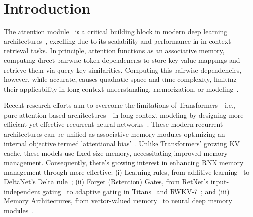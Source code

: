 \section{Introduction}\label{sec:intro}
The attention module~\citep{bahdanau2014neural} is a critical building block in modern deep learning architectures~\citep{transformers, achiam2023gpt, behrouz2024titans, team2025gemma}, excelling due to its scalability and performance in in-context retrieval tasks. In principle, attention functions as an associative memory, computing direct pairwise token dependencies to store key-value mappings and retrieve them via query-key similarities. Computing this  pairwise dependencies, however, while accurate, causes quadratic space and time complexity, limiting their applicability in long context understanding, memorization, or modeling~\citep{liu2024lost, li2024survey, dalal2025one}.







Recent research efforts aim to overcome the limitations of Transformers—i.e., pure attention-based architectures—in long-context modeling by designing more efficient yet effective recurrent neural networks~\citep{schlag2021linear, behrouz2024titans, peng2025rwkv7}. These modern recurrent architectures can be unified as associative memory modules optimizing an internal objective termed 'attentional bias'~\citep{behrouz2025Miras}. Unlike Transformers' growing KV cache, these models use fixed-size memory, necessitating improved memory management. Consequently, there's growing interest in enhancing RNN memory management through more effective: (i) Learning rules, from additive learning~\citep{katharopoulos2020transformers} to DeltaNet's Delta rule~\citep{schlag2021linear}; (ii) Forget (Retention) Gates, from RetNet's input-independent gating~\citep{sun2023retentive} to adaptive gating in Titans~\citep{behrouz2024titans} and RWKV-7~\citep{peng2025rwkv7}; and (iii) Memory Architectures, from vector-valued memory~\citep{sun2023retentive, peng2023rwkv} to neural deep memory modules~\citep{behrouz2024titans, sun2024learning}.



